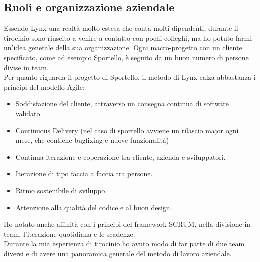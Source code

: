 \subsection{Ruoli e organizzazione aziendale}
Essendo Lynx una realtà molto estesa che conta molti dipendenti, durante il tirocinio sono riuscito a venire a contatto con pochi colleghi, ma ho potuto farmi un'idea generale della sua organizzazione. Ogni macro-progetto con un cliente specificato, come ad esempio Sportello, è seguito da un buon numero di persone divise in team. \\ 
Per quanto riguarda il progetto di Sportello, il metodo di Lynx calza abbastanza i principi del modello Agile:
\begin{itemize}
	\item Soddisfazione del cliente, attraverso un consegna continua di software validato.
	\item Continuous Delivery (nel caso di sportello avviene un rilascio major ogni mese, che contiene bugfixing e nuove funzionalità)
	\item Continua iterazione e coperazione tra cliente, azienda e sviluppatori.
	\item Iterazione di tipo faccia a faccia tra persone.
	\item Ritmo sostenibile di sviluppo.
	\item Attenzione alla qualità del codice e al buon design.
\end{itemize}
Ho notato anche affinità con i principi del framework SCRUM, nella divisione in team, l'iterazione quotidiana e le scadenze.\\
Durante la mia esperienza di tirocinio ho avuto modo di far parte di due team diversi e di avere una panoramica generale del metodo di lavoro aziendale. 
